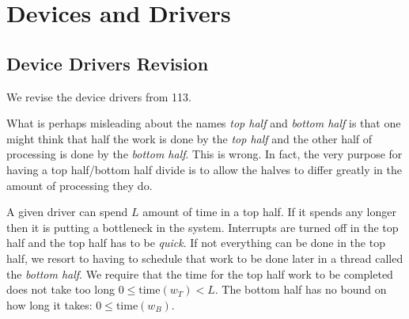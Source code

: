 
\chapter{Devices and Drivers}


\section{Device Drivers Revision}

We revise the device drivers from 113. 

What is perhaps misleading about the names \textit{top half} and \textit{bottom half} 
is that one might think that half the work is done by the \textit{top half} and the other half 
of processing is done by the \textit{bottom half}. This is wrong. In fact, 
the very purpose for having a top half/bottom half divide is to allow the halves to differ 
greatly in the amount of processing they do. 

A given driver can spend $L$ amount of time in a top half. If it spends any longer then 
it is putting a bottleneck in the system. Interrupts are turned off in the top 
half and the top half has to be \textit{quick}. If not everything can be done in the top 
half, we resort to having to schedule that work to be done later in a thread called 
the \textit{bottom half}.
We require that the time for the top half work to be completed does not take too long 
$0 \leq \text{time}(w_T) < L$.
The bottom half has no bound on how long it takes: $0 \leq \text{time}(w_B)$. 


